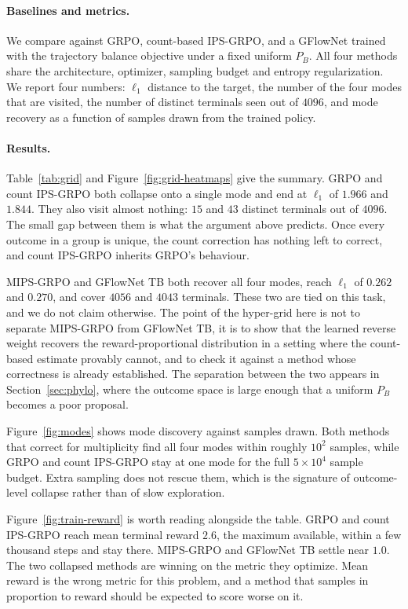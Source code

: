 \documentclass[11pt]{article}
\begin{document}
\paragraph{Baselines and metrics.}
We compare against GRPO, count-based IPS-GRPO, and a GFlowNet trained with the
trajectory balance objective under a fixed uniform $P_B$. All four methods share
the architecture, optimizer, sampling budget and entropy regularization. We
report four numbers: $\ell_1$ distance to the target, the number of the four
modes that are visited, the number of distinct terminals seen out of $4096$, and
mode recovery as a function of samples drawn from the trained policy.

\paragraph{Results.}
Table~\ref{tab:grid} and Figure~\ref{fig:grid-heatmaps} give the summary. GRPO
and count IPS-GRPO both collapse onto a single mode and end at $\ell_1$ of
$1.966$ and $1.844$. They also visit almost nothing: $15$ and $43$ distinct
terminals out of $4096$. The small gap between them is what the argument above
predicts. Once every outcome in a group is unique, the count correction has
nothing left to correct, and count IPS-GRPO inherits GRPO's behaviour.

MIPS-GRPO and GFlowNet TB both recover all four modes, reach $\ell_1$
of $0.262$ and $0.270$, and cover $4056$ and $4043$ terminals. These two are
tied on this task, and we do not claim otherwise. The point of the hyper-grid
here is not to separate MIPS-GRPO from GFlowNet TB, it is to show that
the learned reverse weight recovers the reward-proportional distribution in a
setting where the count-based estimate provably cannot, and to check it against
a method whose correctness is already established. The separation between the
two appears in Section~\ref{sec:phylo}, where the outcome space is large enough
that a uniform $P_B$ becomes a poor proposal.

Figure~\ref{fig:modes} shows mode discovery against samples drawn. Both
methods that correct for multiplicity find all four modes within roughly $10^2$ samples,
while GRPO and count IPS-GRPO stay at one mode for the full $5\times10^4$
sample budget. Extra sampling does not rescue them, which is the signature of
outcome-level collapse rather than of slow exploration.

Figure~\ref{fig:train-reward} is worth reading alongside the table. GRPO and
count IPS-GRPO reach mean terminal reward $2.6$, the maximum available, within a
few thousand steps and stay there. MIPS-GRPO and GFlowNet TB settle
near $1.0$. The two collapsed methods are winning on the metric they optimize.
Mean reward is the wrong metric for this problem, and a method that samples in
proportion to reward should be expected to score worse on it.
\end{document}
